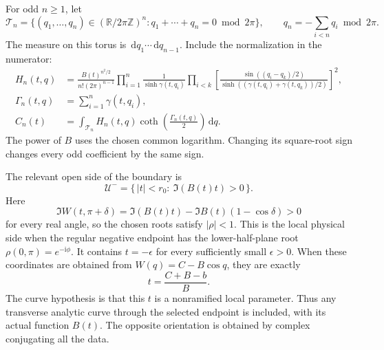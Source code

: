 \documentclass[11pt]{article}
\numberwithin{equation}{section}
\theoremstyle{definition}
\newcommand{\R}{\mathbb R}
\newcommand{\Z}{\mathbb Z}
\newcommand{\ii}{\mathrm i}
\newcommand{\dd}{\,\mathrm d}
\begin{document}
For odd \(n\ge1\), let
\[
 \mathcal T_n=\{(q_1,\ldots,q_n)\in(\R/2\pi\Z)^n:
                         q_1+\cdots+q_n=0\bmod 2\pi\},
 \qquad q_n=-\sum_{i<n}q_i\bmod 2\pi .
 \]
The measure on this torus is \(\dd q_1\cdots\dd q_{n-1}\).  Include
the normalization in the numerator:
\begin{align}
 H_n(t,q)
 &=\frac{B(t)^{n^2/2}}{n!(2\pi)^{n-1}}
   \prod_{i=1}^n\frac1{\sinh\gamma(t,q_i)}
   \prod_{i<k}
   \left[
    \frac{\sin((q_i-q_k)/2)}
         {\sinh((\gamma(t,q_i)+\gamma(t,q_k))/2)}
   \right]^2 ,
 \label{neg:numerator}\\
 \Gamma_n(t,q)&=\sum_{i=1}^n\gamma(t,q_i),\\
 C_n(t)&=\int_{\mathcal T_n}H_n(t,q)
                          \coth\!\left(\frac{\Gamma_n(t,q)}2\right)
                          \dd q .
 \label{neg:coefficient}
\end{align}
The power of \(B\) uses the chosen common logarithm.  Changing its
square-root sign changes every odd coefficient by the same sign.

The relevant open side of the boundary is
\begin{equation}
 \mathcal U^-=\{\,|t|<r_0:\ \Im(B(t)t)>0\,\}.
 \label{neg:physical-side}
\end{equation}
Here
\[
 \Im W(t,\pi+\delta)
   =\Im(B(t)t)-\Im B(t)(1-\cos\delta)>0
 \]
for every real angle, so the chosen roots satisfy \(|\rho|<1\).
This is the local physical side when the regular negative endpoint
has the lower-half-plane root \(\rho(0,\pi)=e^{-\ii\phi}\).
It contains \(t=-\epsilon\) for every sufficiently small
\(\epsilon>0\).  When these coordinates are obtained from
\(W(q)=C-B\cos q\), they are exactly
\[
 t=\frac{C+B-b}{B}.
 \]
The curve hypothesis is that this \(t\) is a nonramified local
parameter.  Thus any transverse analytic curve through the selected
endpoint is included, with its actual function \(B(t)\).  The opposite
orientation is obtained by complex conjugating all the data.
\end{document}
